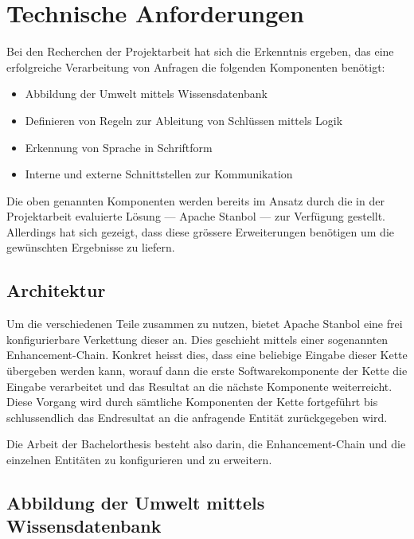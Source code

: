 \chapter{Technische Anforderungen}
\label{chap:technischeAnforderungen}

Bei den Recherchen der Projektarbeit hat sich die Erkenntnis ergeben, das eine erfolgreiche Verarbeitung von Anfragen die folgenden Komponenten benötigt:
\begin{itemize}
	\item Abbildung der Umwelt mittels Wissensdatenbank
	\item Definieren von Regeln zur Ableitung von Schlüssen mittels Logik
	\item Erkennung von Sprache in Schriftform
	\item Interne und externe Schnittstellen zur Kommunikation
\end{itemize}

Die oben genannten Komponenten werden bereits im Ansatz durch die in der Projektarbeit evaluierte Lösung --- Apache Stanbol --- zur Verfügung gestellt. Allerdings hat sich gezeigt, dass diese grössere Erweiterungen benötigen um die gewünschten Ergebnisse zu liefern.

\section{Architektur}
\label{sec:architektur}
Um die verschiedenen Teile zusammen zu nutzen, bietet Apache Stanbol eine frei konfigurierbare Verkettung dieser an. Dies geschieht mittels einer sogenannten Enhancement-Chain. Konkret heisst dies, dass eine beliebige Eingabe dieser Kette übergeben werden kann, worauf dann die erste Softwarekomponente der Kette die Eingabe verarbeitet und das Resultat an die nächste Komponente weiterreicht. Diese Vorgang wird durch sämtliche Komponenten der Kette fortgeführt bis schlussendlich das Endresultat an die anfragende Entität zurückgegeben wird.

Die Arbeit der Bachelorthesis besteht also darin, die Enhancement-Chain und die einzelnen Entitäten zu konfigurieren und zu erweitern.


\section{Abbildung der Umwelt mittels Wissensdatenbank}
\label{sec:architektur_wissensdatenbank}
